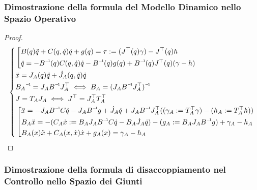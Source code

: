 \subsubsection{Dimostrazione della formula del Modello Dinamico nello Spazio Operativo}

\begin{proof}

\[	
	\left\{
	\begin{aligned}
	&\left[
	\begin{aligned}
	&B(q)\ddot{q} + C(q,\dot{q})\dot{q} + g(q) = \tau := (J^\top(q)\gamma) - J^\top(q)h\\
	&\ddot{q} = -\inv{B}(q)C(q,\dot{q})\dot{q} - \inv{B}(q)g(q) + \inv{B}(q)J^\top(q)(\gamma -h)
	\end{aligned}
	\right.\\
	&\ddot{x}=J_A(q)\ddot{q} + \dot{J}_A(q,\dot{q})\dot{q}\\
	&\inv{B_A} = J_A\inv{B}J_A^\top \iff B_A = \inv{(J_A\inv{B}J_A^\top)}\\
	&J = T_AJ_A \iff J^\top = J_A^\top T_A^\top\\
	&\left[
	\begin{aligned}
	&\ddot{x} = -J_A\inv{B}C\dot{q} - J_A\inv{B}g + \dot{J}_A\dot{q} + J_A\inv{B}J_A^\top((\gamma_A := T_A^\top\gamma) - (h_A := T_A^\top h))\\
	&B_A\ddot{x} = -(C_A\dot{x} := B_AJ_A\inv{B}C\dot{q}-B_A\dot{J}_A\dot{q}) - (g_A := B_AJ_A\inv{B}g) + \gamma_A - h_A\\
	&B_A(x)\ddot{x} + C_A(x,\dot{x})\dot{x} + g_A(x) = \gamma_A - h_A
	\end{aligned}
	\right.
	\end{aligned}
	\right.
\]

\end{proof}

\subsubsection{Dimostrazione della formula di disaccoppiamento nel Controllo nello Spazio dei Giunti}

